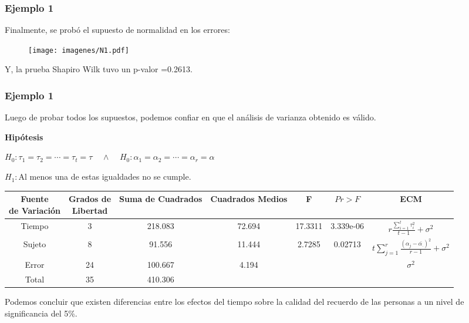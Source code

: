 \documentclass[12pt]{beamer}
\begin{document}
\begin{frame}
\frametitle{Ejemplo 1}
Finalmente, se probó el supuesto de normalidad en los errores:
\begin{figure}[h!]
  \centering
  \texttt{[image: imagenes/N1.pdf]}
\end{figure}
Y, la prueba Shapiro Wilk tuvo un p-valor =0.2613.
\end{frame}

\begin{frame}
\frametitle{Ejemplo 1}
Luego de probar todos los supuestos, podemos confiar en que el análisis de varianza obtenido es válido.

\textbf{Hipótesis}
\begin{center}
$H_0:\tau_1=\tau_2=\cdots=\tau_t=\tau \;\;\;\; \wedge \;\;\;\; H_0:\alpha_1=\alpha_2=\cdots=\alpha_r=\alpha $

$H_1:$Al menos una de estas igualdades no se cumple.
\end{center}
\begin{table}[htbp]
  \centering
\resizebox{12cm}{!} {
\begin{tabular}{|c|c|c|c|c|c|c|}
\hline 
\parbox{7em}{\centering Fuente\\ de Variación} & \parbox{7em}{\centering Grados de\\ Libertad} & Suma de Cuadrados & Cuadrados Medios & F & $Pr>F$ & ECM \\ 
\hline 
Tiempo & 3 & 218.083 & 72.694 & 17.3311 & 3.339e-06  & $r\frac{\sum\limits_{i=1}^{t}\tau_i^2}{t-1}+\sigma^2$\\ 
Sujeto & 8 & 91.556 & 11.444 & 2.7285 & 0.02713 &$t\sum\limits_{j=1}^{r}\frac{(\alpha_{j}-\bar{\alpha_{.}})^2}{r-1}+\sigma^2$ \\
Error & 24 & 100.667 & 4.194 &   & & $\sigma^2$\\ 
Total & 35 & 410.306 &  &   & &\\ 
\hline 
\end{tabular} 
}
\label{tab:addlabel}%
\end{table}%
Podemos concluir que existen diferencias entre los efectos del tiempo sobre la calidad del recuerdo de las personas a un nivel de
significancia del 5\%.
\end{frame}
\end{document}
